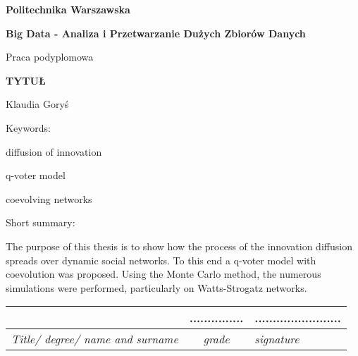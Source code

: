 \documentclass[12pt,a4paper,twoside]{book}
\begin{document}
\begin{titlepage}
\noindent\textbf{\large Politechnika Warszawska}
\par\medskip\noindent
\textbf{Big Data - Analiza i Przetwarzanie Dużych Zbiorów Danych}
\par\noindent
\vspace*{36pt}
\begin{center}
\LARGE Praca podyplomowa
\end{center}
\vspace*{24pt}
\begin{center}
\uppercase{\Large\bfseries%
Tytuł}
\end{center}
\vspace*{12pt}
\begin{center}
Klaudia Goryś
\end{center}
\vspace*{12pt}

\begin{flushright}
Keywords:\par\noindent
diffusion of innovation \par\noindent
q-voter model \par\noindent
coevolving networks \par\noindent
\end{flushright}

\begin{flushleft}
Short summary:\par
\end{flushleft}

The purpose of this thesis is to show how the process of the innovation diffusion spreads over dynamic social networks. To this end a q-voter model with coevolution was proposed. Using the Monte Carlo method, the numerous simulations were performed, particularly on Watts-Strogatz networks.
\smallskip
\vspace*{0.3cm}

\begin{flushleft}
\begin{tabularx}{\textwidth}{|c|c|X|}
\hline
{\large  } & {...............} & {........................}  \\
\hline
\textit{\footnotesize Title/ degree/ name and surname} & \textit{\footnotesize grade} & \textit{\footnotesize signature} \\
\hline
\end{tabularx}
\smallskip
\end{flushleft}


\end{titlepage}
\end{document}
